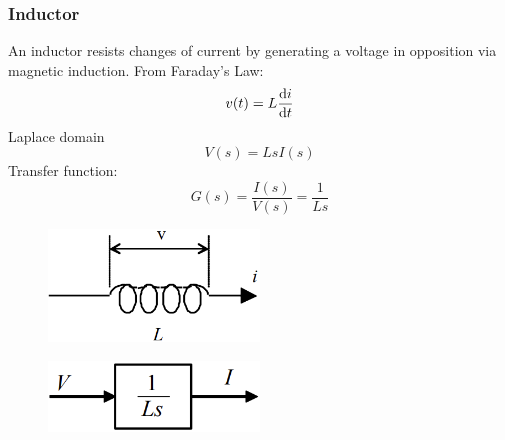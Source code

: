 \documentclass[class=report, crop=false, 12pt,a4paper, tikz, border=4mm]{standalone}
\begin{document}
\subsubsection{Inductor}
An inductor resists changes of current by generating a voltage in opposition via magnetic induction. From Faraday's Law:
\begin{equation}
  v(t) = L \frac{\dif i}{\dif t}
\end{equation}
Laplace domain
\begin{equation}
  V(s) = LsI(s)
\end{equation}
Transfer function:
\begin{equation}
  G(s) = \frac{I(s)}{V(s)} = \frac{1}{Ls}
\end{equation}
\begin{figure}[H]
  \centering
  \includegraphics[width = 0.5\textwidth]{../img/diagram7.png}
\end{figure}
\begin{figure}[H]
  \centering
  \includegraphics[width = 0.5\textwidth]{../img/blockdiagram18.png}
\end{figure}
\end{document}
